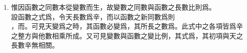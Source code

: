 \begin{enumerate} [label={第\chinese*款},nolistsep]
	曾在第一百七十七款中證式之右邊爲由函數\CJKmove 而成。其戊之同數因爲\CJKmove，卽\uline{訥白爾}對數之根也。所以卯若愈大則\CJKmove 必愈與\CJKmove 相近，而其限爲\CJKmove。\\
	如令，則\CJKmove 之限爲戊，卽\CJKmove，故其函數爲常數。
	\item 惟因函數之同數本從變數而生，故變數之同數與函數之長數比則爲\CJKmove。\\
	設函數之式爲\CJKmove，令天長數爲辛，而以函數之新同數爲\CJKmove 則\\
	\CJKmove，而\CJKmove。可見天變爲\CJKmove 之時，其函數\CJKmove 必變爲\CJKmove，其所長之數爲\CJKmove。此式中之各項皆爲辛之整方與他數相乘所成。又可見變數與函數之變比例，其式爲\CJKmove，其初項\CJKmove 與天之長數辛無相關。\\

\end{enumerate}
